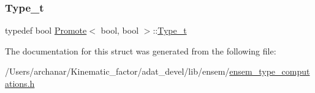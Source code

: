 \subsubsection{\texorpdfstring{Type\_t}{Type\_t}\hspace{0.1cm}{\footnotesize\ttfamily [2/2]}}
{\footnotesize\ttfamily typedef bool \mbox{\hyperlink{structPromote}{Promote}}$<$ bool, bool $>$\+::\mbox{\hyperlink{structPromote_3_01bool_00_01bool_01_4_a102643eea236300318f1131229a59556}{Type\+\_\+t}}}



The documentation for this struct was generated from the following file\+:\begin{DoxyCompactItemize}
\item 
/\+Users/archanar/\+Kinematic\+\_\+factor/adat\+\_\+devel/lib/ensem/\mbox{\hyperlink{lib_2ensem_2ensem__type__computations_8h}{ensem\+\_\+type\+\_\+computations.\+h}}\end{DoxyCompactItemize}
